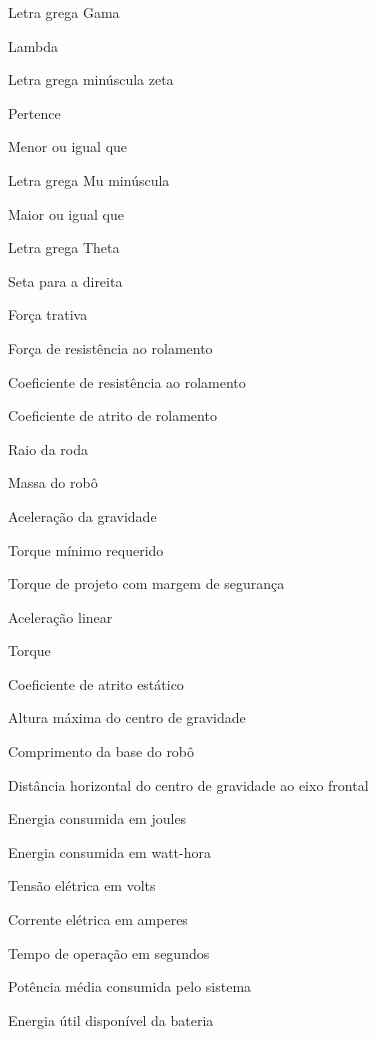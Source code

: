 \begin{simbolos}
  \item[$\Gamma$] Letra grega Gama
  \item[$\Lambda$] Lambda
  \item[$\zeta$] Letra grega minúscula zeta
  \item[$\in$] Pertence
  \item[$\leq$] Menor ou igual que
  \item[$\mu$] Letra grega Mu minúscula
  \item[$\geq$] Maior ou igual que
  \item[$\theta$] Letra grega Theta
  \item[$\rightarrow$] Seta para a direita
  \item[$F_t$] Força trativa
  \item[$F_{rr}$] Força de resistência ao rolamento
  \item[$C_{rr}$] Coeficiente de resistência ao rolamento
  \item[$b$] Coeficiente de atrito de rolamento
  \item[$R$] Raio da roda
  \item[$m$] Massa do robô
  \item[$g$] Aceleração da gravidade
  \item[$T_{min}$] Torque mínimo requerido
  \item[$T_{proj}$] Torque de projeto com margem de segurança
  \item[$a$] Aceleração linear
  \item[$\tau$] Torque
  \item[$\mu_e$] Coeficiente de atrito estático
  \item[$h_{max}$] Altura máxima do centro de gravidade
  \item[$L$] Comprimento da base do robô
  \item[$x$] Distância horizontal do centro de gravidade ao eixo frontal
  \item[$E_J$] Energia consumida em joules
  \item[$E_{Wh}$] Energia consumida em watt-hora
  \item[$V$] Tensão elétrica em volts
  \item[$I$] Corrente elétrica em amperes
  \item[$t$] Tempo de operação em segundos
  \item[$P_{media}$] Potência média consumida pelo sistema
  \item[$E_{util}$] Energia útil disponível da bateria
\end{simbolos}